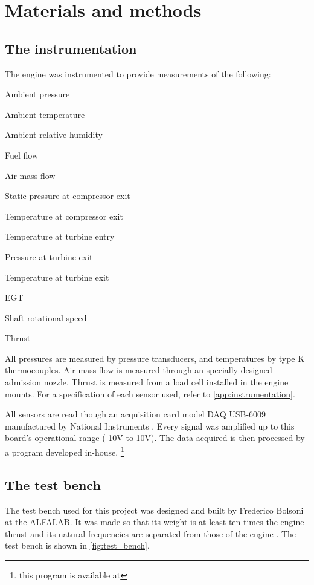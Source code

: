 \chapter{Materials and methods}
\label{ch:methods}

\section{The instrumentation}
The engine was instrumented to provide measurements of the following:
\begin{compactitem}
    \item Ambient pressure
    \item Ambient temperature
    \item Ambient relative humidity
    \item Fuel flow
    \item Air mass flow
    \item Static pressure at compressor exit
    \item Temperature at compressor exit
    \item Temperature at turbine entry
    \item Pressure at turbine exit
    \item Temperature at turbine exit
    \item \gls{EGT}
    \item Shaft rotational speed
    \item Thrust
\end{compactitem}

All pressures are measured by pressure transducers, and temperatures by type K thermocouples. 
Air mass flow is measured through an specially designed admission nozzle. 
Thrust is measured from a load cell installed in the engine mounts.
For a specification of each sensor used, refer to \cref{app:instrumentation}.

All sensors are read though an acquisition card 
model DAQ USB-6009 manufactured by National Instruments .
Every signal was amplified up to this board's operational range (-10V to 10V). 
The data acquired is then processed by a program developed in-house.%
\footnote{this program is available at }

\section{The test bench}

The test bench used for this project was designed and built by Frederico Bolsoni at the \gls{ALFALAB}.
It was made so that its weight is at least ten times the engine thrust 
 and its natural frequencies are separated from those of the engine \cite{bolsoni}.
The test bench is shown in \cref{fig:test_bench}.

